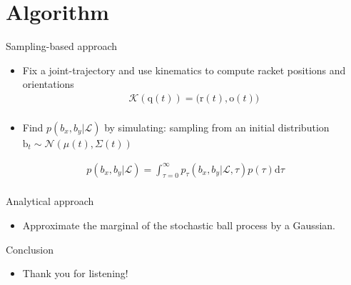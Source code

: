 \documentclass[handout]{beamer}
\newcommand{\boldvec}[1]{\boldsymbol{\mathrm{#1}}}
\let\vec\boldvec
\newcommand{\kin}{\mathcal{K}} %
\newcommand{\joint}{\vec{q}} %
\newcommand{\ball}{\vec{b}} %
\newcommand{\racket}{\vec{r}} %
\newcommand{\orient}{\vec{o}} %
\newcommand{\landTime}{\tau} %
\newcommand{\landEvent}{\mathcal{L}} %
\newcommand{\landDist}{p(\tau)} %
\begin{document}
\section{Algorithm}
%
\begin{frame}{Sampling-based approach}
\begin{itemize}
\item Fix a joint-trajectory and use kinematics to compute racket positions and orientations
%
\begin{align}
\kin(\joint(t)) = \big(\racket(t), \orient(t)\big) \\
\end{align}
%
\item Find $p(b_x,b_y|\landEvent)$ by simulating: sampling from an initial distribution $\ball_t \sim \mathcal{N}(\mu(t),\Sigma(t))$
\end{itemize}
\begin{align}
p(b_x,b_y|\landEvent) = \int_{\landTime = 0}^{\infty} p_{\landTime}(b_x,b_y|\landEvent,\landTime)\landDist \textrm{d}\landTime
\label{marginalProcess} \\
\end{align}
\end{frame}
%
\begin{frame}{Analytical approach}
\begin{itemize}
\item Approximate the marginal of the stochastic ball process by a Gaussian.
\end{itemize}
\end{frame}
%
\begin{frame}{Conclusion}
\begin{itemize}
\item Thank you for listening!
\end{itemize}
\end{frame}	
%
%
%

%
\end{document}
